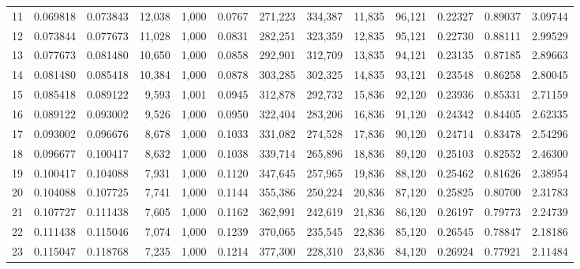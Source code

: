 \begin{tabular}{rrrrrrrrrrrrr}
11  &  0.069818 &  0.073843 &  12,038 &  1,000 &                                     0.0767 &  271,223 &  334,387 &   11,835 &   96,121 &  0.22327 &  0.89037 &  3.09744 \\
12  &  0.073844 &  0.077673 &  11,028 &  1,000 &                                     0.0831 &  282,251 &  323,359 &   12,835 &   95,121 &  0.22730 &  0.88111 &  2.99529 \\
13  &  0.077673 &  0.081480 &  10,650 &  1,000 &                                     0.0858 &  292,901 &  312,709 &   13,835 &   94,121 &  0.23135 &  0.87185 &  2.89663 \\
14  &  0.081480 &  0.085418 &  10,384 &  1,000 &                                     0.0878 &  303,285 &  302,325 &   14,835 &   93,121 &  0.23548 &  0.86258 &  2.80045 \\
15  &  0.085418 &  0.089122 &   9,593 &  1,001 &                                     0.0945 &  312,878 &  292,732 &   15,836 &   92,120 &  0.23936 &  0.85331 &  2.71159 \\
16  &  0.089122 &  0.093002 &   9,526 &  1,000 &                                     0.0950 &  322,404 &  283,206 &   16,836 &   91,120 &  0.24342 &  0.84405 &  2.62335 \\
17  &  0.093002 &  0.096676 &   8,678 &  1,000 &                                     0.1033 &  331,082 &  274,528 &   17,836 &   90,120 &  0.24714 &  0.83478 &  2.54296 \\
18  &  0.096677 &  0.100417 &   8,632 &  1,000 &                                     0.1038 &  339,714 &  265,896 &   18,836 &   89,120 &  0.25103 &  0.82552 &  2.46300 \\
19  &  0.100417 &  0.104088 &   7,931 &  1,000 &                                     0.1120 &  347,645 &  257,965 &   19,836 &   88,120 &  0.25462 &  0.81626 &  2.38954 \\
20  &  0.104088 &  0.107725 &   7,741 &  1,000 &                                     0.1144 &  355,386 &  250,224 &   20,836 &   87,120 &  0.25825 &  0.80700 &  2.31783 \\
21  &  0.107727 &  0.111438 &   7,605 &  1,000 &                                     0.1162 &  362,991 &  242,619 &   21,836 &   86,120 &  0.26197 &  0.79773 &  2.24739 \\
22  &  0.111438 &  0.115046 &   7,074 &  1,000 &                                     0.1239 &  370,065 &  235,545 &   22,836 &   85,120 &  0.26545 &  0.78847 &  2.18186 \\
23  &  0.115047 &  0.118768 &   7,235 &  1,000 &                                     0.1214 &  377,300 &  228,310 &   23,836 &   84,120 &  0.26924 &  0.77921 &  2.11484 \\

\end{tabular}
